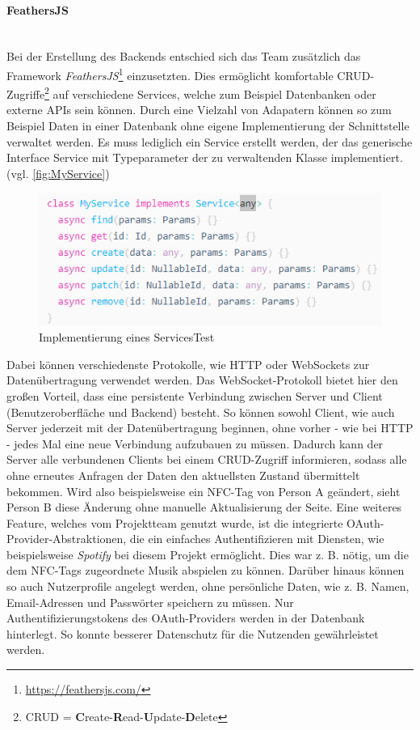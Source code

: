 \documentclass[10pt, a4paper]{article}
\newcommand*\setcaptioncitation[1]{\def\captioncitation{\textit{Source:}~#1}}
\let\captioncitation\relax
\begin{document}
\begin{onehalfspace}
  \paragraph*{FeathersJS} $~$ \\
  Bei der Erstellung des Backends entschied sich das Team zusätzlich das Framework \textit{FeathersJS}\footnote{\raggedright\url{https://feathersjs.com/}} einzusetzten.
  Dies ermöglicht komfortable CRUD-Zugriffe\footnote{CRUD = \textbf{C}reate-\textbf{R}ead-\textbf{U}pdate-\textbf{D}elete}  auf verschiedene Services, welche zum Beispiel Datenbanken oder externe APIs sein können.
  Durch eine Vielzahl von Adapatern können so zum Beispiel Daten in einer Datenbank ohne eigene Implementierung der Schnittstelle verwaltet werden.
  Es muss lediglich ein Service erstellt werden, der das generische Interface Service mit Typeparameter der zu verwaltenden Klasse implementiert. (vgl. \autoref{fig:MyService})
  \begin{figure}[ht]
    \includegraphics[width=\linewidth]{MyFeathersService.png}
    \setcaptioncitation{https://docs.feathersjs.com/guides/basics/services.html}
    \caption{Implementierung eines ServicesTest}
    \label{fig:MyService}
  \end{figure}
  Dabei können verschiedenste Protokolle, wie HTTP oder WebSockets zur Datenübertragung verwendet werden.
  Das WebSocket-Protokoll bietet hier den großen Vorteil, dass eine persistente Verbindung zwischen Server und Client (Benutzeroberfläche und Backend) besteht.
  So können sowohl Client, wie auch Server jederzeit mit der Datenübertragung beginnen, ohne vorher - wie bei HTTP - jedes Mal eine neue Verbindung aufzubauen zu müssen. \cite{WebSockets}
  Dadurch kann der Server alle verbundenen Clients bei einem CRUD-Zugriff informieren, sodass alle ohne erneutes Anfragen der Daten den aktuellsten Zustand übermittelt bekommen.
  Wird also beispielsweise ein NFC-Tag von Person A geändert, sieht Person B diese Änderung ohne manuelle Aktualisierung der Seite.
  Eine weiteres Feature, welches vom Projektteam genutzt wurde, ist die integrierte OAuth-Provider-Abstraktionen, die ein einfaches Authentifizieren mit Diensten, wie beispielsweise \textit{Spotify} bei diesem Projekt ermöglicht.
  Dies war z. B. nötig, um die dem NFC-Tags zugeordnete Musik abspielen zu können.
  Darüber hinaus können so auch Nutzerprofile angelegt werden, ohne persönliche Daten, wie z. B. Namen, Email-Adressen und Passwörter speichern zu müssen.
  Nur Authentifizierungstokens des OAuth-Providers werden in der Datenbank hinterlegt.
  So konnte besserer Datenschutz für die Nutzenden gewährleistet werden.



\end{onehalfspace}
\end{document}
